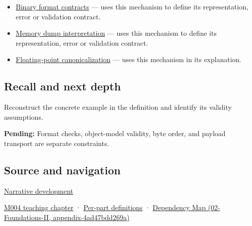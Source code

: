 \begin{itemize}
\item
  \hyperref[appendix-590bbb2424c1]{Binary format contracts} --- uses this mechanism to define its representation, error or validation contract.
\item
  \hyperref[appendix-230b59c0676b]{Memory dump interpretation} --- uses this mechanism to define its representation, error or validation contract.
\item
  \hyperref[appendix-e90053a4b201]{Floating-point canonicalization} --- uses this mechanism in its explanation.
\end{itemize}

\subsection{Recall and next depth}\label{appendix-34ee45f161c1-recall-and-next-depth}

Reconstruct the concrete example in the definition and identify its validity assumptions.

\textbf{Pending:} Format checks, object-model validity, byte order, and payload transport are separate constraints.

\subsection{Source and navigation}\label{appendix-34ee45f161c1-source-and-navigation}

\hyperref[01-foundations-i-ch002-bytes-become-a-durable-agreement]{Narrative development}

\hyperref[01-foundations-i-ch001-a-stretching-ruler-for-real-valued-quantities]{M004 teaching chapter} · \hyperref[appendix-fd090d982a15-m004---parts-61-76]{Per-part definitions} · \href{../02-Foundations-II/main.pdf\#nameddest=appendix-4ad47bdd269a}{Dependency Map (02-Foundations-II, appendix-4ad47bdd269a)}
